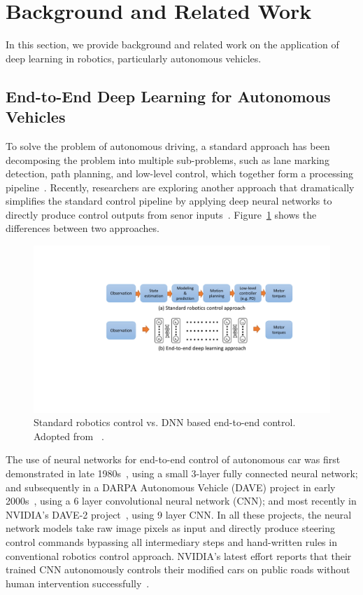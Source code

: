\section{Background and Related Work} \label{sec:background}

In this section, we provide background and related work on the
application of deep learning in robotics, particularly autonomous
vehicles. 

\subsection{End-to-End Deep Learning for Autonomous Vehicles}


To solve the problem of autonomous driving, a standard approach has
been decomposing the problem into multiple sub-problems,
such as lane marking detection, path planning, and low-level
control, which together form a processing pipeline~\cite{Bojarski2016}.
Recently, researchers are exploring another approach that dramatically
simplifies the standard control pipeline by applying deep neural
networks to directly produce control outputs from senor
inputs~\cite{Levine2016}. Figure~\ref{fig:end-to-end-control}
shows the differences between two approaches.

\begin{figure}[h]
  \centering
  \includegraphics[width=.5\textwidth]{figs/endtoend_redrawn}
  \caption{Standard robotics control vs. DNN based end-to-end
    control. Adopted from ~\cite{Levine2017cs294}.}
  \label{fig:end-to-end-control}
\end{figure}

The use of neural networks for end-to-end control of autonomous
car was first demonstrated in late 1980s~\cite{Pomerleau1989},
using a small 3-layer fully connected neural network; and subsequently
in a DARPA Autonomous Vehicle (DAVE) project in early
2000s~\cite{LeCun:04}, using a 6 layer convolutional neural network
(CNN); and most recently in NVIDIA's DAVE-2
project~\cite{Bojarski2016}, using 9 layer CNN. In all these projects,
the neural network models take raw image pixels as input and directly
produce steering control commands bypassing all intermediary steps and
hand-written rules in conventional robotics control approach.  
NVIDIA's latest effort reports that their trained CNN
autonomously controls their modified cars on public roads without human
intervention successfully~\cite{Bojarski2016}.

